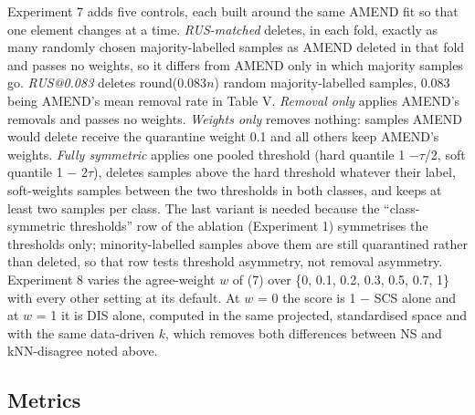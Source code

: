 \documentclass[conference]{IEEEtran}
\begin{document}
Experiment 7 adds five controls, each built around the same AMEND fit so that one element changes at a time. \emph{RUS-matched} deletes, in each fold, exactly as many randomly chosen majority-labelled samples as AMEND deleted in that fold and passes no weights, so it differs from AMEND only in which majority samples go. \emph{RUS@0.083} deletes round(0.083$n$) random majority-labelled samples, 0.083 being AMEND's mean removal rate in Table V. \emph{Removal only} applies AMEND's removals and passes no weights. \emph{Weights only} removes nothing: samples AMEND would delete receive the quarantine weight 0.1 and all others keep AMEND's weights. \emph{Fully symmetric} applies one pooled threshold (hard quantile 1 $- \tau $/2, soft quantile 1 $-$ 2$\tau $), deletes samples above the hard threshold whatever their label, soft-weights samples between the two thresholds in both classes, and keeps at least two samples per class. The last variant is needed because the ``class-symmetric thresholds'' row of the ablation (Experiment 1) symmetrises the thresholds only; minority-labelled samples above them are still quarantined rather than deleted, so that row tests threshold asymmetry, not removal asymmetry. Experiment 8 varies the agree-weight $w$ of (7) over \{0, 0.1, 0.2, 0.3, 0.5, 0.7, 1\} with every other setting at its default. At $w$ = 0 the score is 1 $-$ SCS alone and at $w$ = 1 it is DIS alone, computed in the same projected, standardised space and with the same data-driven $k$, which removes both differences between NS and kNN-disagree noted above.

\subsection{Metrics}\label{sec:metrics}
\end{document}
